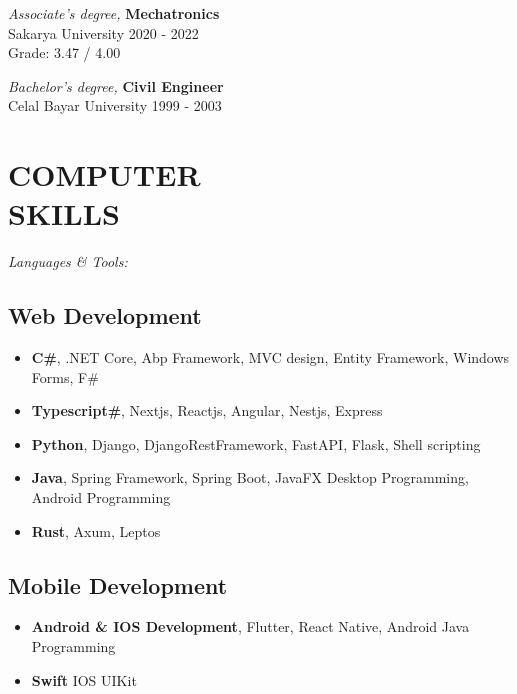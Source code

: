 \documentclass[line,margin]{res}
\begin{document}
\begin{resume}
                {\sl Associate's degree,} \textbf{Mechatronics} \\
                Sakarya University 
                2020 - 2022 \\
                Grade: 3.47 / 4.00 

                {\sl Bachelor's degree,} \textbf{Civil Engineer} \\
                Celal Bayar University 
                1999 - 2003 \\
                
\newpage

\section{COMPUTER \\ SKILLS} {\sl Languages \& Tools:} \\
                \subsection{Web Development}
                 \begin{itemize}  \itemsep -2pt %
                   \item \textbf{C\#}, .NET Core, Abp Framework, MVC design, Entity Framework, Windows Forms, F\#
                   \item \textbf{Typescript\#}, Nextjs, Reactjs, Angular, Nestjs, Express
                   \item \textbf{Python}, Django, DjangoRestFramework, FastAPI, Flask, Shell scripting
                   \item \textbf{Java}, Spring Framework, Spring Boot, JavaFX Desktop Programming, Android Programming
                   \item \textbf{Rust}, Axum, Leptos
                 \end{itemize}
                 \subsection{Mobile Development}
                 \begin{itemize}  \itemsep -2pt %
                   \item \textbf{Android \& IOS Development}, Flutter, React Native, Android Java Programming
                   \item \textbf{Swift} IOS UIKit
                 \end{itemize}

\end{resume}
\end{document}
